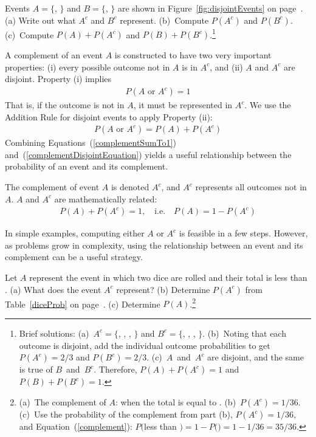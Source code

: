 \begin{doublespace}
\begin{exercise}
Events $A=\{$, $\}$ and $B=\{$, $\}$ are shown in Figure~\ref{fig:disjointEvents} on page~\pageref{fig:disjointEvents}. (a) Write out what $A^c$ and $B^c$ represent. (b)~Compute $P(A^c)$ and $P(B^c)$. (c)~Compute $P(A)+P(A^c)$ and $P(B)+P(B^c)$.\footnote{Brief solutions: (a)~$A^c=\{$, , , $\}$ and $B^c=\{$, , , $\}$. (b)~Noting that each outcome is disjoint, add the individual outcome probabilities to get $P(A^c)=2/3$ and $P(B^c)=2/3$. (c)~$A$~and~$A^c$ are disjoint, and the same is true of $B$~and~$B^c$. Therefore, $P(A) + P(A^c) = 1$ and $P(B) + P(B^c) = 1$.}
\end{exercise}

A complement of an event $A$ is constructed to have two very important properties: (i) every possible outcome not in $A$ is in $A^c$, and (ii) $A$ and $A^c$ are disjoint. Property (i) implies
\begin{eqnarray}
P(A\text{ or }A^c) = 1
\label{complementSumTo1}
\end{eqnarray}
That is, if the outcome is not in $A$, it must be represented in $A^c$. We use the Addition Rule for disjoint events to apply Property (ii):
\begin{eqnarray}
P(A\text{ or }A^c) = P(A) + P(A^c)
\label{complementDisjointEquation}
\end{eqnarray}
Combining Equations~(\ref{complementSumTo1}) and~(\ref{complementDisjointEquation}) yields a useful relationship between the probability of an event and its complement.

\begin{termBox}{
The complement of event $A$ is denoted $A^c$, and $A^c$ represents all outcomes not in~$A$. $A$ and $A^c$ are mathematically related: \vspace{-2mm}
\begin{eqnarray}\label{complement}
P(A) + P(A^c) = 1, \quad\text{i.e.}\quad P(A) = 1-P(A^c)
\end{eqnarray}\vspace{-6.5mm}}
\end{termBox}

In simple examples, computing either $A$ or $A^c$ is feasible in a few steps. However, as problems grow in complexity, using the relationship between an event and its complement can be a useful strategy.

\begin{exercise}
Let $A$ represent the event in which two dice are rolled and their total is less than . (a) What does the event $A^c$ represent? (b) Determine $P(A^c)$ from Table~\ref{diceProb} on page~\pageref{diceProb}. (c) Determine $P(A)$.\footnote{(a)~The complement of $A$: when the total is equal to . (b)~$P(A^c) = 1/36$. (c)~Use the probability of the complement from part (b), $P(A^c) = 1/36$, and Equation~(\ref{complement}): $P($less than $) = 1 - P($$) = 1 - 1/36 = 35/36$.}
\end{exercise}


\end{doublespace}
